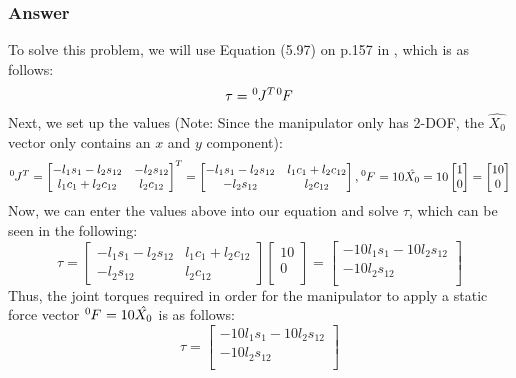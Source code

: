\documentclass[10pt]{article}
\begin{document}
\subsubsection*{Answer}
To solve this problem, we will use Equation (5.97) on p.157 in \cite{textbook}, which is as follows:
\[
\tau = \tensor*[^{0}]{J}{^T} \tensor*[^{0}]{F}{}
\]
Next, we set up the values (Note: Since the manipulator only has 2-DOF, the \(\hat{X_{0}}\) vector only contains an \(x\) and \(y\) component):
\[
\tensor*[^{0}]{J}{^T} = 
\begin{bmatrix}
    -l_{1}s_{1} - l_{2}s_{12}    & -l_{2}s_{12}   \\
    l_{1}c_{1}+l_{2}c_{12}      & l_{2}c_{12}
\end{bmatrix}^T
=
\begin{bmatrix}
    -l_{1}s_{1} - l_{2}s_{12}    & l_{1}c_{1}+l_{2}c_{12}    \\
    -l_{2}s_{12}     & l_{2}c_{12}
\end{bmatrix},
\tensor*[^{0}]{F}{} =
10\hat{X_{0}} =
10
\begin{bmatrix}
    1     \\
    0     \\
\end{bmatrix}
=
\begin{bmatrix}
    10     \\
    0     \\
\end{bmatrix}
\]
Now, we can enter the values above into our equation and solve \(\tau\), which can be seen in the following:
\[
\tau = 
\begin{bmatrix}
    -l_{1}s_{1} - l_{2}s_{12}    & l_{1}c_{1}+l_{2}c_{12}    \\
    -l_{2}s_{12}     & l_{2}c_{12}
\end{bmatrix}
\begin{bmatrix}
    10     \\
    0     \\
\end{bmatrix}
=
\begin{bmatrix}
    -10 l_{1}s_{1} - 10 l_{2}s_{12}     \\
    -10 l_{2}s_{12}    \\
\end{bmatrix}
\]
Thus, the joint torques required in order for the manipulator to apply a static force vector \(\tensor*[^{0}]{F}{} = 10 \hat{X_{0}}\) is as follows:
\[
\tau = 
\begin{bmatrix}
    -10 l_{1}s_{1} - 10 l_{2}s_{12}     \\
    -10 l_{2}s_{12}    \\
\end{bmatrix}
\]
\pagebreak
\end{document}
